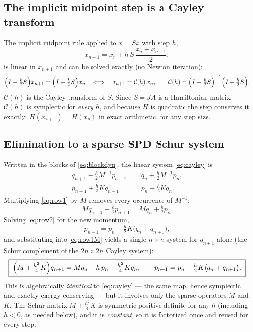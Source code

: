 \subsection{The implicit midpoint step is a Cayley transform}

The implicit midpoint rule applied to $\dot x = S x$ with step $h$,
\begin{equation}
  x_{n+1} = x_n + h\, S\, \frac{x_n + x_{n+1}}{2},
\end{equation}
is linear in $x_{n+1}$ and can be solved exactly (no Newton iteration):
\begin{equation}
  \Bigl(I - \tfrac{h}{2} S\Bigr) x_{n+1}
  = \Bigl(I + \tfrac{h}{2} S\Bigr) x_n
  \quad\Longleftrightarrow\quad
  x_{n+1} = \mathcal{C}(h)\, x_n,
  \qquad
  \mathcal{C}(h) = \Bigl(I - \tfrac{h}{2} S\Bigr)^{-1}
                   \Bigl(I + \tfrac{h}{2} S\Bigr).
  \label{eq:cayley}
\end{equation}
$\mathcal{C}(h)$ is the Cayley transform of $S$. Since $S = JA$ is a
Hamiltonian matrix, $\mathcal{C}(h)$ is symplectic for \emph{every} $h$,
and because $H$ is quadratic the step conserves it exactly:
$H(x_{n+1}) = H(x_n)$ in exact arithmetic, for any step size.

\subsection{Elimination to a sparse SPD Schur system}

Written in the blocks of \eqref{eq:blockdyn}, the linear system
\eqref{eq:cayley} is
\begin{align}
  q_{n+1} - \tfrac{h}{2} M^{-1} p_{n+1}
    &= q_n + \tfrac{h}{2} M^{-1} p_n ,
  \label{eq:row1}\\
  p_{n+1} + \tfrac{h}{2} K q_{n+1}
    &= p_n - \tfrac{h}{2} K q_n .
  \label{eq:row2}
\end{align}
Multiplying \eqref{eq:row1} by $M$ removes every occurrence of $M^{-1}$:
\begin{equation}
  M q_{n+1} - \tfrac{h}{2} p_{n+1}
  = M q_n + \tfrac{h}{2} p_n .
  \label{eq:row1M}
\end{equation}
Solving \eqref{eq:row2} for the new momentum,
\begin{equation}
  p_{n+1} = p_n - \tfrac{h}{2} K \bigl( q_n + q_{n+1} \bigr),
  \label{eq:pupdate}
\end{equation}
and substituting into \eqref{eq:row1M} yields a single $n \times n$ system
for $q_{n+1}$ alone (the Schur complement of the $2n \times 2n$ Cayley
system):
\begin{equation}
  \boxed{\;
  \Bigl(M + \tfrac{h^2}{4} K\Bigr) q_{n+1}
  = M q_n + h\, p_n - \tfrac{h^2}{4} K q_n ,
  \qquad
  p_{n+1} = p_n - \tfrac{h}{2} K \bigl( q_n + q_{n+1} \bigr).
  \;}
  \label{eq:schur}
\end{equation}
This is algebraically \emph{identical} to \eqref{eq:cayley} --- the same
map, hence symplectic and exactly energy-conserving --- but it involves
only the sparse operators $M$ and $K$. The Schur matrix
$M + \tfrac{h^2}{4}K$ is symmetric positive definite for any $h$
(including $h<0$, as needed below), and it is \emph{constant}, so it is
factorized once and reused for every step.

